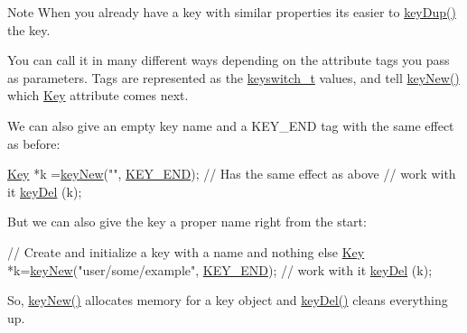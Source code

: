 \begin{DoxyNote}{Note}
When you already have a key with similar properties its easier to \hyperlink{group__key_gae6ec6a60cc4b8c1463fa08623d056ce3}{key\+Dup()} the key.
\end{DoxyNote}
You can call it in many different ways depending on the attribute tags you pass as parameters. Tags are represented as the \hyperlink{group__key_ga91fb3178848bd682000958089abbaf40}{keyswitch\+\_\+t} values, and tell \hyperlink{group__key_gad23c65b44bf48d773759e1f9a4d43b89}{key\+New()} which \hyperlink{classkdb_1_1Key}{Key} attribute comes next.

We can also give an empty key name and a K\+E\+Y\+\_\+\+E\+N\+D tag with the same effect as before\+:


\begin{DoxyCodeInclude}
\hyperlink{classkdb_1_1Key_a5679f5cae63caddd64a60388b9cc77fa}{Key} *k =\hyperlink{group__key_gad23c65b44bf48d773759e1f9a4d43b89}{keyNew}(\textcolor{stringliteral}{""}, \hyperlink{group__key_gga91fb3178848bd682000958089abbaf40aa8adb6fcb92dec58fb19410eacfdd403}{KEY\_END}); \textcolor{comment}{// Has the same effect as above}
\textcolor{comment}{// work with it}
\hyperlink{group__key_ga3df95bbc2494e3e6703ece5639be5bb1}{keyDel} (k);
\end{DoxyCodeInclude}
 But we can also give the key a proper name right from the start\+:


\begin{DoxyCodeInclude}
\textcolor{comment}{// Create and initialize a key with a name and nothing else}
\hyperlink{classkdb_1_1Key_a5679f5cae63caddd64a60388b9cc77fa}{Key} *k=\hyperlink{group__key_gad23c65b44bf48d773759e1f9a4d43b89}{keyNew}(\textcolor{stringliteral}{"user/some/example"}, \hyperlink{group__key_gga91fb3178848bd682000958089abbaf40aa8adb6fcb92dec58fb19410eacfdd403}{KEY\_END});
\textcolor{comment}{// work with it}
\hyperlink{group__key_ga3df95bbc2494e3e6703ece5639be5bb1}{keyDel} (k);
\end{DoxyCodeInclude}
 So, \hyperlink{group__key_gad23c65b44bf48d773759e1f9a4d43b89}{key\+New()} allocates memory for a key object and \hyperlink{group__key_ga3df95bbc2494e3e6703ece5639be5bb1}{key\+Del()} cleans everything up.

